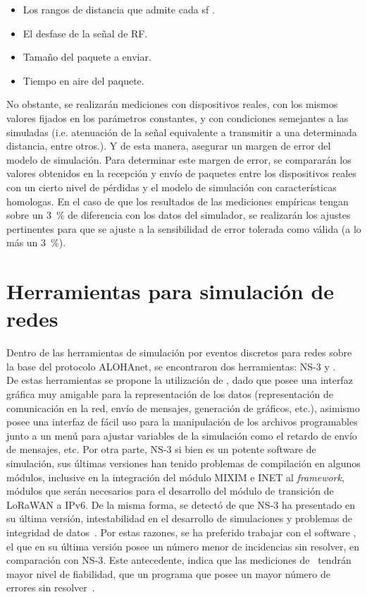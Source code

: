 \begin{justify}
\begin{itemize}
\item Los rangos de distancia que admite cada \gls{sf} .
\item El desfase de la señal de RF.
\item Tamaño del paquete a enviar.
\item Tiempo en aire del paquete.
\end{itemize}
No obstante, se realizarán mediciones con dispositivos reales, con los mismos valores fijados en los parámetros constantes, y con condiciones semejantes a las simuladas (i.e. atenuación de la señal equivalente a transmitir a una determinada distancia, entre otros.). Y de esta manera, asegurar un margen de error del modelo de simulación. Para determinar este margen de error, se compararán los valores obtenidos en la recepción y envío de paquetes entre los dispositivos reales con un cierto nivel de pérdidas y el modelo de simulación con características homologas. En el caso de que los resultados de las mediciones empíricas tengan sobre un \SI{3}{\percent} de diferencia con los datos del simulador, se realizarán los ajustes pertinentes para que se ajuste a la sensibilidad de error tolerada como válida (a lo más un \SI{3}{\percent}).
\section{Herramientas para simulación de redes}
Dentro de las herramientas de simulación por eventos discretos para redes sobre la base del protocolo ALOHAnet, se encontraron dos herramientas: NS-3 y \OMNET.\\
De estas herramientas se propone la utilización de \OMNET, dado que posee una interfaz gráfica muy amigable para la representación de los datos (representación de comunicación en la red, envío de mensajes, generación de gráficos, etc.), asimismo posee una interfaz de fácil uso para la manipulación de los archivos programables junto a un menú para ajustar variables de la simulación como el retardo de envío de mensajes, etc. Por otra parte, NS-3 si bien es un potente software de simulación, sus últimas versiones han tenido problemas de compilación en algunos módulos, inclusive en la integración del módulo MIXIM e INET al \textit{framework}, módulos que serán necesarios para el desarrollo del módulo de transición de LoRaWAN a IPv6. De la misma forma, se detectó de que NS-3 ha presentado en su última versión, intestabilidad en el desarrollo de simulaciones y problemas de integridad de datos~\cite{bugtrack}. Por estas razones, se ha preferido trabajar con el software \OMNET, el que en su última versión posee un número menor de incidencias sin resolver, en comparación con NS-3. Este antecedente, indica que las mediciones de \OMNET~tendrán mayor nivel de fiabilidad, que un programa que posee un mayor número de errores sin resolver~\cite{bugtrack}\cite{bugtrack2}.

\end{justify}